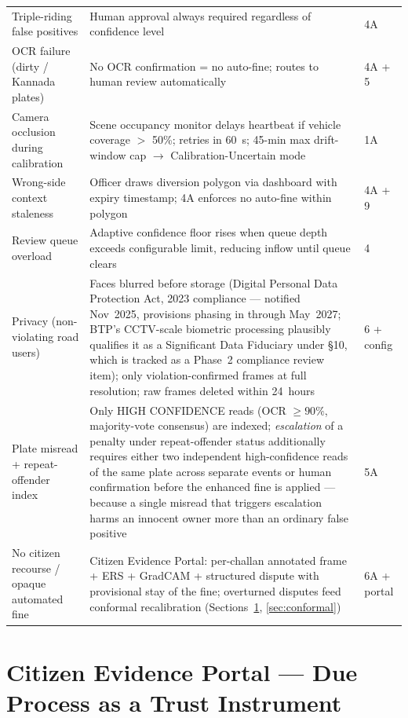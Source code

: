 \documentclass[11pt,a4paper]{article}
\begin{document}
\begin{longtable}{L{4cm} L{9cm} C{1.8cm}}
    Triple-riding false positives & Human approval always required regardless of confidence level & 4A \\
    OCR failure (dirty / Kannada plates) & No OCR confirmation = no auto-fine; routes to human review automatically & 4A + 5 \\
    Camera occlusion during calibration & Scene occupancy monitor delays heartbeat if vehicle coverage $>$ 50\%; retries in 60~s; 45-min max drift-window cap $\rightarrow$ Calibration-Uncertain mode & 1A \\
    Wrong-side context staleness & Officer draws diversion polygon via dashboard with expiry timestamp; 4A enforces no auto-fine within polygon & 4A + 9 \\
    Review queue overload & Adaptive confidence floor rises when queue depth exceeds configurable limit, reducing inflow until queue clears & 4 \\
    Privacy (non-violating road users) & Faces blurred before storage (Digital Personal Data Protection Act, 2023 compliance --- notified Nov~2025, provisions phasing in through May~2027; BTP's CCTV-scale biometric processing plausibly qualifies it as a Significant Data Fiduciary under \S10, which is tracked as a Phase~2 compliance review item); only violation-confirmed frames at full resolution; raw frames deleted within 24~hours & 6 + config \\
    Plate misread + repeat-offender index & Only HIGH CONFIDENCE reads (OCR $\geq 90\%$, majority-vote consensus) are indexed; \emph{escalation} of a penalty under repeat-offender status additionally requires either two independent high-confidence reads of the same plate across separate events or human confirmation before the enhanced fine is applied --- because a single misread that triggers escalation harms an innocent owner more than an ordinary false positive & 5A \\
    No citizen recourse / opaque automated fine & Citizen Evidence Portal: per-challan annotated frame + ERS + GradCAM + structured dispute with provisional stay of the fine; overturned disputes feed conformal recalibration (Sections~\ref{sec:citizen}, \ref{sec:conformal}) & 6A + portal \\
\end{longtable}

\section{Citizen Evidence Portal — Due Process as a Trust Instrument}
\label{sec:citizen}
\end{document}
